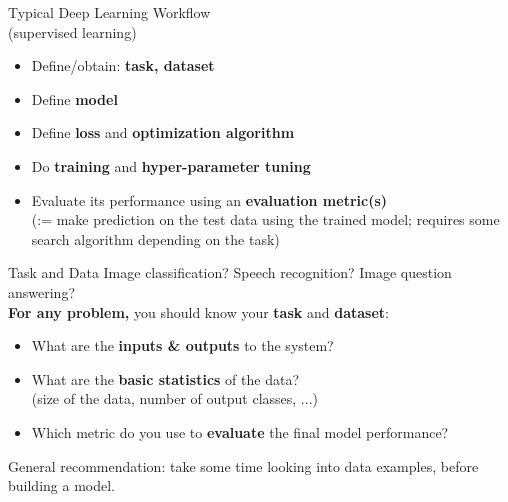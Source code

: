 \begin{frame}{Typical Deep Learning Workflow\\ (supervised learning)}
\begin{itemize}
\item Define/obtain: \textbf{task, dataset}
\item Define \textbf{model}
\item Define \textbf{loss} and \textbf{optimization algorithm}
\item Do \textbf{training} and \textbf{hyper-parameter tuning}
\item Evaluate its performance using an \textbf{evaluation metric(s)}\\
(:= make prediction on the test data using the trained model; requires some search algorithm depending on the task)
\end{itemize}
\end{frame}

\begin{frame}{Task and Data}
Image classification? Speech recognition? Image question answering?\\
\vspace{5mm}
\textbf{For any problem,}
you should know your \textbf{\alert{task}} and \textbf{\alert{dataset}}:
\begin{itemize}
\item What are the \textbf{inputs \& outputs} to the system?
\item What are the \textbf{basic statistics} of the data?\\
 (size of the data, number of output classes, ...)
\item Which metric do you use to \textbf{evaluate} the final model performance?
\end{itemize}
\vspace{2mm}
General recommendation: take some time looking into data examples,
before building a model.
\end{frame}

